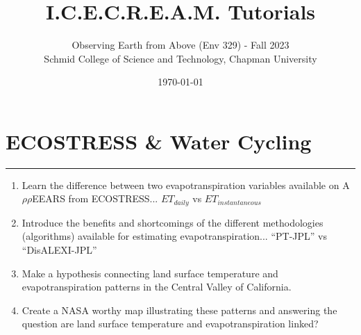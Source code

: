 \documentclass[oneside,a4paper,11pt,explicit]{book}
\title{I.C.E.C.R.E.A.M. Tutorials}
\subtitle{\small Observing Earth from Above (Env 329) - Fall 2023  \\
	\small Schmid College of Science and Technology, Chapman University}
\date{\today}
\begin{document}
\dominitoc

\tableofcontents

\setcounter{chapter}{5} %

\chapter{ECOSTRESS \& Water Cycling} %

\vspace{-2em}

\minitoc

\hrule

\vspace{1em}

\begin{tcolorbox}[enhanced,frame style image=blueshade.png,
	opacityback=0.75,opacitybacktitle=0.25,
	colback=blue!5!white,colframe=blue!75!black,title={\Large \textbf{Objectives:}}]
	\large
	\begin{enumerate}
		\item Learn the difference between two evapotranspiration variables available on A$\rho\rho$EEARS from ECOSTRESS... $ET_{daily}$ vs $ET_{instantaneous}$
		\item Introduce the benefits and shortcomings of the different methodologies (algorithms) available for estimating evapotranspiration... ``PT-JPL'' vs ``DisALEXI-JPL'' 
		\item Make a hypothesis connecting land surface temperature and evapotranspiration patterns in the Central Valley of California.
		\item Create a NASA worthy map illustrating these patterns and answering the question are land surface temperature and evapotranspiration linked?
	\end{enumerate}
\end{tcolorbox}

\clearpage

\fancyhead{}
\end{document}
